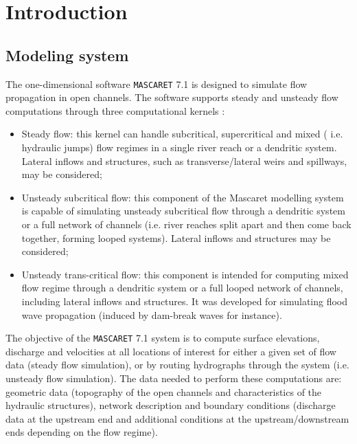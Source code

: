 \documentclass[a4paper,12pt]{article}
\begin{document}
\tableofcontents

\newpage

%

\section{Introduction}


\subsection{Modeling system}

\hspace{0.5cm} The one-dimensional software \texttt{MASCARET} 7.1 is designed to simulate flow propagation in open channels. The software supports steady and unsteady flow computations through three computational kernels : 

\begin{itemize}
  \item Steady flow: this kernel can handle subcritical, supercritical and mixed ( i.e. hydraulic jumps) flow regimes in a single river reach or a dendritic system. Lateral inflows and structures, such as transverse/lateral weirs and spillways, may be considered;
  \item Unsteady subcritical flow:  this component of the Mascaret modelling system is capable of simulating unsteady subcritical flow through a dendritic system or a full network of channels (i.e. river reaches split apart and then come back together, forming looped systems). Lateral inflows and structures may be considered;
  \item Unsteady trans-critical flow:  this component is intended for computing mixed flow regime through a dendritic system or a full looped network of channels, including lateral inflows and structures. It was developed for simulating flood wave propagation (induced by dam-break waves for instance).
\end{itemize}

\hspace{0.5cm} The objective of the \texttt{MASCARET} 7.1 system is to compute surface elevations, discharge and velocities at all locations of interest for either a given set of flow data (steady flow simulation), or by routing hydrographs through the system (i.e. unsteady flow simulation). The data needed to perform these computations are: geometric data (topography of the open channels and characteristics of the hydraulic structures), network description and boundary conditions (discharge data at the upstream end and additional conditions at the upstream/downstream ends depending on the flow regime). 
\end{document}
